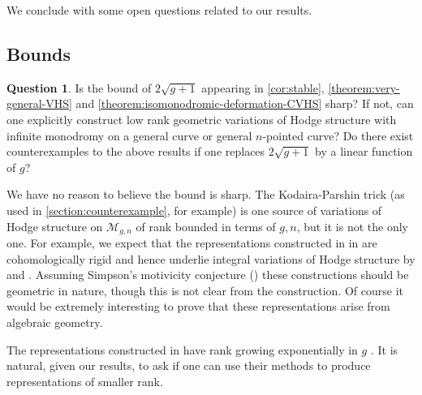 \documentclass[12 pt]{amsart}
\theoremstyle{plain}
\theoremstyle{definition}
\newtheorem{question}[subsubsection]{Question}
\theoremstyle{remark}
\numberwithin{equation}{section}
\begin{document}
We conclude with some open questions related to our results.
\subsection{Bounds}
	
\begin{question}\label{question:bounds}
Is the bound of $2\sqrt{g+1}$ appearing in \autoref{cor:stable},
\autoref{theorem:very-general-VHS} and 
\autoref{theorem:isomonodromic-deformation-CVHS} sharp? If not, can one
explicitly construct low rank geometric variations of Hodge structure with
infinite monodromy on a general curve or general $n$-pointed curve?
Do there exist counterexamples to the above results if one replaces $2
\sqrt{g+1}$ by a linear function of $g$?
\end{question}
We have no reason to believe the bound is sharp. The Kodaira-Parshin trick (as
used in \autoref{section:counterexample}, for example) is one source of
variations of Hodge structure on $\mathscr{M}_{g,n}$ of rank bounded in terms of
$g, n$, but it is not the only one. For example, we expect that the representations constructed in
in \cite{koberda2016quotients} are cohomologically rigid and hence underlie
integral variations of Hodge structure by \cite[Theorem
1.1]{esnault2018cohomologically} and \cite[Theorem 3]{simpson1992higgs}.
Assuming Simpson's motivicity conjecture (\cite[Conjecture,
p.~9]{simpson1992higgs}) these constructions should be geometric in nature, though this is not clear from the construction. Of course it would be extremely interesting to prove that these representations arise from algebraic geometry.

The representations constructed in \cite{koberda2016quotients} have rank
growing exponentially in $g$ \cite[Corollary 4.5]{koberda2016quotients}.
It is natural, given our results, to ask if one can use their methods to produce representations of smaller rank.
\end{document}
